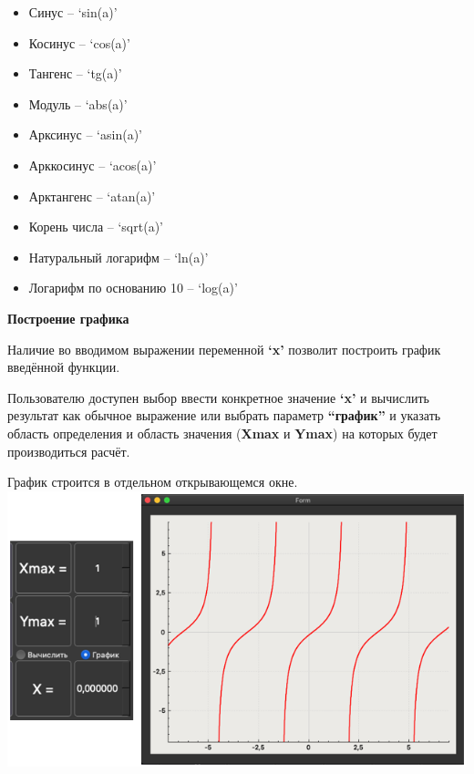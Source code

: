 \documentclass[]{article}
\begin{document}
\begin{itemize}
\item

  Синус -- `sin(a)'

\item

  Косинус -- `cos(a)'

\item

  Тангенс -- `tg(a)'

\item

  Модуль -- `abs(a)'

\item

  Арксинус -- `asin(a)'

\item

  Арккосинус -- `acos(a)'

\item

  Арктангенс -- `atan(a)'

\item

  Корень числа -- `sqrt(a)'

\item

  Натуральный логарифм -- `ln(a)'

\item

  Логарифм по основанию 10 -- `log(a)'

\end{itemize}
\pagebreak[10]
\huge
\textbf{Построение графика}
\newline

\LARGE
Наличие
во вводимом выражении переменной \textbf{`x'} позволит построить график
введённой функции.

Пользователю доступен выбор ввести конкретное значение \textbf{`x'} и
вычислить результат как обычное выражение или выбрать параметр
\textbf{``график''} и указать область определения и область значения
(\textbf{Xmax} и \textbf{Ymax}) на которых будет производиться расчёт.

График строится в отдельном открывающемся окне.
\includegraphics[bb=0 0 500 350]{media/image2.png}
\end{document}
